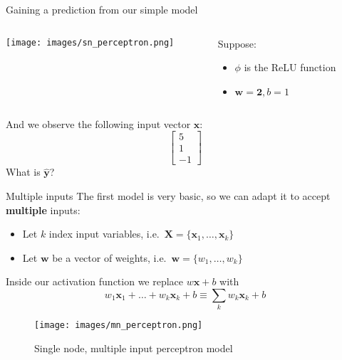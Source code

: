 \documentclass[
  ignorenonframetext,
]{beamer}
\providecommand{\tightlist}{%
  \setlength{\itemsep}{0pt}\setlength{\parskip}{0pt}}
\begin{document}
\begin{frame}{Gaining a prediction from our simple model}
\protect\hypertarget{gaining-a-prediction-from-our-simple-model}{}
\begin{columns}
\begin{column}{0.4\textwidth}
\texttt{[image: images/sn\_perceptron.png]}
\end{column}
\begin{column}{0.48\textwidth}
Suppose:
\begin{itemize}
\item $\phi$ is the ReLU function
\item $\bm{w} = \bm{2}, b = 1$
\end{itemize}
\end{column}
\end{columns}

And we observe the following input vector \(\bm{x}\): \[
\begin{bmatrix}
5 \\
1 \\
-1 
\end{bmatrix}  
\] What is \(\hat{\bm{y}}\)?
\end{frame}

\begin{frame}{Multiple inputs}
\protect\hypertarget{multiple-inputs}{}
The first model is very basic, so we can adapt it to accept
\textbf{multiple} inputs:

\begin{itemize}
\tightlist
\item
  Let \(k\) index input variables,
  i.e.~\(\bm{X} = \{\bm{x}_1,\ldots,\bm{x}_k\}\)
\item
  Let \(\bm{w}\) be a vector of weights,
  i.e.~\(\bm{w} = \{w_1, \ldots, w_k \}\)
\end{itemize}

Inside our activation function we replace \(w\bm{x} + b\) with \[
w_1\bm{x}_1 + \ldots + w_k\bm{x}_k + b \equiv \sum_k{w_k\bm{x}_k} + b
\]

\begin{figure}
\centering
\texttt{[image: images/mn\_perceptron.png]}
\caption{Single node, multiple input perceptron model}
\end{figure}
\end{frame}
\end{document}
